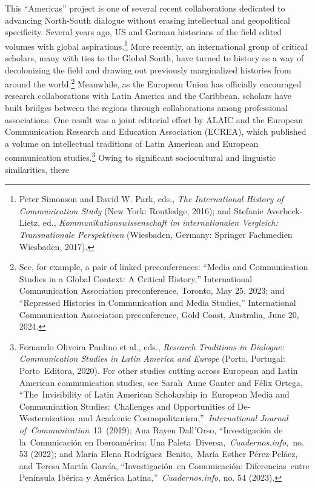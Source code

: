 \documentclass{tufte-handout}
\begin{document}
This ``Americas'' project is one of several recent collaborations
dedicated to advancing North-South dialogue without erasing intellectual
and geopolitical specificity. Several years ago, US and German
historians of the field edited volumes with global
aspirations.\footnote{Peter Simonson and David W. Park, eds., \emph{The
  International History of Communication Study} (New York: Routledge,
  2016); and Stefanie Averbeck-Lietz, ed.,
  \emph{Kommunikationswissenschaft im internationalen Vergleich:
  Transnationale Perspektiven} (Wiesbaden, Germany: Springer Fachmedien
  Wiesbaden, 2017).} More recently, an international group of critical
scholars, many with ties to the Global South, have turned to history as
a way of decolonizing the field and drawing out previously marginalized
histories from around the world.\footnote{See, for example, a pair of
  linked preconferences: ``Media and Communication Studies in a Global
  Context: A Critical History,'' International Communication Association
  preconference, Toronto, May 25, 2023; and ``Repressed Histories in
  Communication and Media Studies,'' International Communication
  Association preconference, Gold Coast, Australia, June 20, 2024.}
Meanwhile, as the European Union has officially encouraged research
collaborations with Latin America and the Caribbean, scholars have built
bridges between the regions through collaborations among professional
associations. One result was a joint editorial effort by ALAIC and the
European Communication Research and Education Association (ECREA), which
published a volume on intellectual traditions of Latin American and
European communication studies.\footnote{Fernando Oliveira Paulino et
  al., eds., \emph{Research Traditions in Dialogue: Communication
  Studies in Latin America and Europe} (Porto, Portugal: Porto~Editora,
  2020). For other studies cutting across European and Latin American
  communication studies, see Sarah~Anne Ganter and Félix Ortega,
  ``The~Invisibility of Latin American Scholarship in~European Media and
  Communication Studies:~Challenges and Opportunities of
  De-Westernization~and Academic Cosmopolitanism,''~\emph{International
  Journal of~Communication}~13~(2019); Ana Rayen Dall'Orso,
  ``Investigación de la~Comunicación en Iberoamérica: Una
  Paleta~Diversa,~\emph{Cuadernos.info},\emph{~}no. 53 (2022); and María
  Elena Rodríguez~Benito,~María Esther Pérez-Peláez, and Teresa Martín
  García, ``Investigación~en Comunicación: Diferencias~entre Península
  Ibérica y América Latina,''~\emph{Cuadernos.info}, no. 54 (2023).}
Owing to significant sociocultural and linguistic similarities, there
\end{document}
